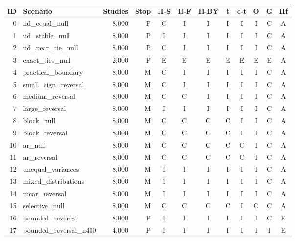 \begin{tabular}{rlrrcccccccc}
\toprule
ID & Scenario & Studies & Stop & H-S & H-F & H-BY & t & c-t & O & G & Hf \\
\midrule
0 & iid\_equal\_null & 8,000 & P & C & I & I & I & I & I & C & A \\
1 & iid\_stable\_null & 8,000 & P & I & I & I & I & I & I & C & A \\
2 & iid\_near\_tie\_null & 8,000 & P & C & I & I & I & I & I & C & A \\
3 & exact\_ties\_null & 2,000 & P & E & E & E & E & E & E & E & A \\
4 & practical\_boundary & 8,000 & M & C & I & I & I & I & I & C & A \\
5 & small\_sign\_reversal & 8,000 & M & C & I & I & I & I & I & C & A \\
6 & medium\_reversal & 8,000 & M & C & C & I & I & I & I & C & A \\
7 & large\_reversal & 8,000 & M & I & I & I & I & I & I & C & A \\
8 & block\_null & 8,000 & M & C & C & C & C & I & I & C & A \\
9 & block\_reversal & 8,000 & M & C & C & C & C & I & I & C & A \\
10 & ar\_null & 8,000 & M & C & C & C & C & C & I & C & A \\
11 & ar\_reversal & 8,000 & M & C & C & C & C & C & I & C & A \\
12 & unequal\_variances & 8,000 & M & I & I & I & I & I & I & C & A \\
13 & mixed\_distributions & 8,000 & M & I & I & I & I & I & I & C & A \\
14 & mcar\_reversal & 8,000 & M & I & I & I & I & I & I & C & A \\
15 & selective\_null & 8,000 & M & C & C & C & C & I & C & C & A \\
16 & bounded\_reversal & 8,000 & P & I & I & I & I & I & I & C & E \\
17 & bounded\_reversal\_n400 & 4,000 & P & I & I & I & I & I & I & I & E \\
\bottomrule
\end{tabular}
